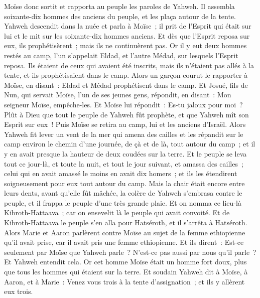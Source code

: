 \begin{multicols}{2}
Moïse donc sortit et rapporta au peuple les paroles de Yahweh. Il assembla soixante-dix hommes des anciens du peuple, et les plaça autour de la tente.
Yahweh descendit dans la nuée et parla à Moïse~; il prit de l'Esprit qui était sur lui et le mit sur les soixante-dix hommes anciens. Et dès que l'Esprit reposa sur eux, ils prophétisèrent~; mais ils ne continuèrent pas.
Or il y eut deux hommes restés au camp, l'un s'appelait Eldad, et l'autre Médad, sur lesquels l'Esprit reposa. Ils étaient de ceux qui avaient été inscrits, mais ils n'étaient pas allés à la tente, et ils prophétisaient dans le camp.
Alors un garçon courut le rapporter à Moïse, en disant~: Eldad et Médad prophétisent dans le camp.
Et Josué, fils de Nun, qui servait Moïse, l'un de ses jeunes gens, répondit, en disant~: Mon seigneur Moïse, empêche-les.
Et Moïse lui répondit~: Es-tu jaloux pour moi~? Plût à Dieu que tout le peuple de Yahweh fût prophète, et que Yahweh mît son Esprit sur eux~!
Puis Moïse se retira au camp, lui et les anciens d'Israël.
Alors Yahweh fit lever un vent de la mer qui amena des cailles et les répandit sur le camp environ le chemin d'une journée, de çà et de là, tout autour du camp~; et il y en avait presque la hauteur de deux coudées sur la terre.
Et le peuple se leva tout ce jour-là, et toute la nuit, et tout le jour suivant, et amassa des cailles~; celui qui en avait amassé le moins en avait dix homers~; et ils les étendirent soigneusement pour eux tout autour du camp.
Mais la chair était encore entre leurs dents, avant qu'elle fût mâchée, la colère de Yahweh s'embrasa contre le peuple, et il frappa le peuple d'une très grande plaie.
Et on nomma ce lieu-là Kibroth-Hattaava~; car on ensevelit là le peuple qui avait convoité.
Et de Kibroth-Hattaava le peuple s'en alla pour Hatséroth, et il s'arrêta à Hatséroth.
\VerseOne{}Alors Marie et Aaron parlèrent contre Moïse au sujet de la femme ethiopienne qu'il avait prise, car il avait pris une femme ethiopienne.
Et ils dirent~: Est-ce seulement par Moïse que Yahweh parle~? N'est-ce pas aussi par nous qu'il parle~? Et Yahweh entendit cela. 
Or cet homme Moïse était un homme fort doux, plus que tous les hommes qui étaient sur la terre.
Et soudain Yahweh dit à Moïse, à Aaron, et à Marie~: Venez vous trois à la tente d'assignation~; et ils y allèrent eux trois.

\end{multicols}
